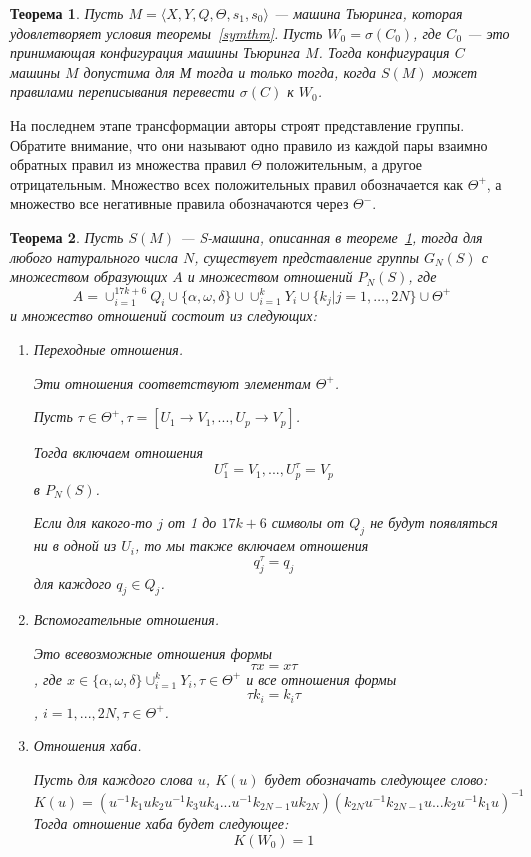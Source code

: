 \documentclass[14pt]{matmex-diploma-custom}
\newtheorem{thm}{Теорема}[subsection]
\begin{document}
\begin{thm} \label{thmsm}
Пусть $M = \langle X, Y, Q, \Theta, s_1, s_0 \rangle$ --- машина Тьюринга, 
которая удовлетворяет условия теоремы~\ref{symthm}. Пусть $W_0 = \sigma(C_0)$, где $C_0$ --- это 
принимающая конфигурация машины Тьюринга $M$.
Тогда конфигурация $C$ машины $M$ допустима для М тогда и только тогда, когда $S(M)$ может правилами переписывания перевести $\sigma (C)$ к $W_0$.
\end{thm}

На последнем этапе трансформации авторы строят представление группы.
Обратите внимание, что они называют одно правило из каждой пары взаимно обратных правил из множества правил $ \Theta $ положительным, а другое отрицательным.
Множество всех положительных правил обозначается как $ \Theta^+ $, а множество
все негативные правила обозначаются через $ \Theta^- $.

\begin{thm} \label{sm2gr}
Пусть $ S (M) $ --- S-машина, описанная в теореме~\ref{thmsm},
тогда для любого натурального числа $ N $,
существует представление группы $ G_N (S) $
с множеством образующих $ A $ и множеством отношений $ P_N (S) $,
где
$$A = \cup^{17k+6}_{i=1} Q_i \cup \{\alpha, \omega, \delta\}
\cup \cup^k_{i=1}Y_i \cup \{k_j | j = 1, \dots, 2N\} \cup \Theta^+$$
и множество отношений состоит из следующих:
\begin{enumerate}
    \item Переходные отношения. 
    
    Эти отношения соответствуют элементам $\Theta^+$.
    
Пусть $\tau \in \Theta^+, \tau = [U_1 \to V_1, ..., U_p → V_p]$. 

Тогда включаем отношения 
$$U^{\tau}_1 = V_1, ..., U^{\tau}_p = V_p$$
в $P_N(S)$. 

Если для какого-то $j$ от 1 до $17k + 6$ символы от $Q_j$ не будут появляться ни в одной из $U_i$, 
то мы также включаем отношения 
$$q^{\tau}_j = q_j$$
для каждого $q_j \in Q_j$.
    \item Вспомогательные отношения.

Это всевозможные отношения формы 
$$\tau x = x \tau$$
, где 
$x \in \{\alpha, \omega, \delta\} \cup^k_{i=1} Y_i, \tau \in \Theta^+$ и все отношения формы 
$$\tau k_i = k_i\tau$$ 
, $i = 1, ..., 2N, \tau \in \Theta^+$.
    \item Отношения хаба.

Пусть для каждого слова $u$, $K(u)$ будет обозначать следующее слово:
$$K(u) = (u^{−1}k_1uk_2u^{−1}k_3uk_4 . . . u^{−1}k_{2N−1}uk_{2N})(k_{2N}u^{−1}k_{2N−1}u . . . k_2u^{−1}k_1u)^{−1}$$
Тогда отношение хаба будет следующее:
$$K(W_0) = 1$$
\end{enumerate}
\end{thm}
\end{document}
